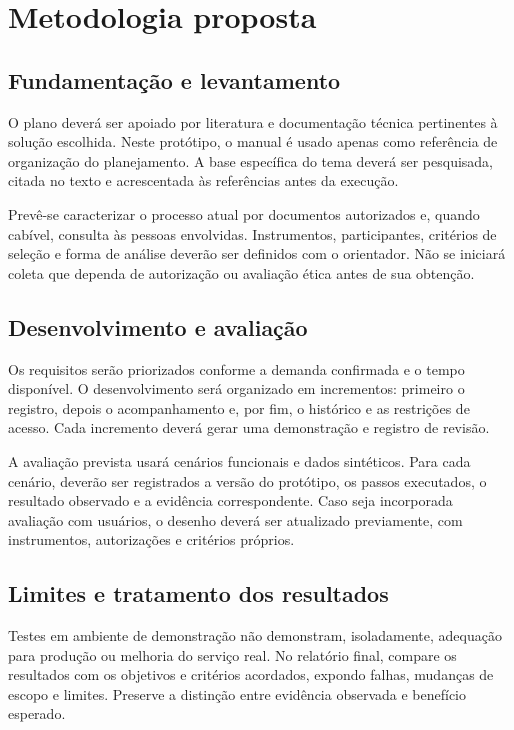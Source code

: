 \chapter{Metodologia proposta}

\section{Fundamentação e levantamento}

O plano deverá ser apoiado por literatura e documentação técnica pertinentes
à solução escolhida. Neste protótipo, o manual é usado apenas como referência
de organização do planejamento. A base específica do tema deverá ser pesquisada,
citada no texto e acrescentada às referências antes da execução.

Prevê-se caracterizar o processo atual por documentos autorizados e, quando
cabível, consulta às pessoas envolvidas. Instrumentos, participantes, critérios
de seleção e forma de análise deverão ser definidos com o orientador. Não se
iniciará coleta que dependa de autorização ou avaliação ética antes de sua
obtenção.

\section{Desenvolvimento e avaliação}

Os requisitos serão priorizados conforme a demanda confirmada e o tempo
disponível. O desenvolvimento será organizado em incrementos: primeiro o
registro, depois o acompanhamento e, por fim, o histórico e as restrições de
acesso. Cada incremento deverá gerar uma demonstração e registro de revisão.

A avaliação prevista usará cenários funcionais e dados sintéticos. Para cada
cenário, deverão ser registrados a versão do protótipo, os passos executados,
o resultado observado e a evidência correspondente. Caso seja incorporada
avaliação com usuários, o desenho deverá ser atualizado previamente, com
instrumentos, autorizações e critérios próprios.

\section{Limites e tratamento dos resultados}

Testes em ambiente de demonstração não demonstram, isoladamente, adequação
para produção ou melhoria do serviço real. No relatório final, compare os
resultados com os objetivos e critérios acordados, expondo falhas, mudanças
de escopo e limites. Preserve a distinção entre evidência observada e benefício
esperado.


